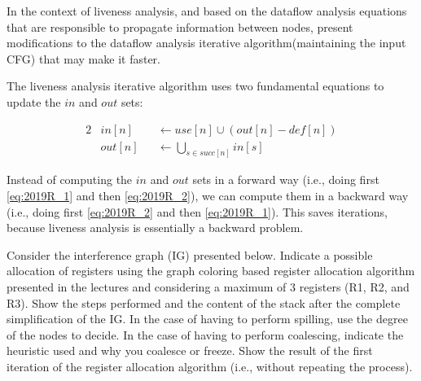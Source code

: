 \documentclass[docid=2019]{comp_exam_round2}
\begin{document}
\ansseparator

\vspace{-1em}
\begin{center}
\end{center}

\question
In the context of liveness analysis, and based on the dataflow analysis equations that are responsible to propagate information between nodes, present modifications to the dataflow analysis iterative algorithm(maintaining the input CFG) that may make it faster.

\ansseparator

\noindent
The liveness analysis iterative algorithm uses two fundamental equations to update the $in$ and $out$ sets:

\begin{alignat}{2}
    & in [n] && \leftarrow use[n] \cup (out[n] - def[n]) \label{eq:2019R_1} \\
    & out[n] && \leftarrow \bigcup_{s \in succ[n]}{in[s]} \label{eq:2019R_2}
\end{alignat}

Instead of computing the $in$ and $out$ sets in a forward way (i.e., doing first \ref{eq:2019R_1} and then \ref{eq:2019R_2}), we can compute them in a backward way (i.e., doing first \ref{eq:2019R_2} and then \ref{eq:2019R_1}). This saves iterations, because liveness analysis is essentially a backward problem.

\question
Consider the interference graph (IG) presented below. Indicate a possible allocation of registers using the graph coloring based register allocation algorithm presented in the lectures and considering a maximum of 3 registers (R1, R2, and R3). Show the steps performed and the content of the stack after the complete simplification of the IG. In the case of having to perform spilling, use the degree of the nodes to decide. In the case of having to perform coalescing, indicate the heuristic used and why you coalesce or freeze. Show the result of the first iteration of the register allocation algorithm (i.e., without repeating the process).
\end{document}

